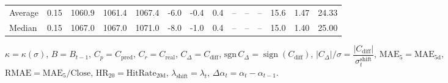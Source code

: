 \begin{threeparttable}
{\begin{tabular}{lrrrrrrrrrrrrr}
Average &     0.15 & 1060.9 & 1061.4 & 1067.4 &       -6.0 &                     -0.4 &                 0.4 &         -- &        -- &             -- &             15.6 &            1.47 &                  24.33 \\
 Median &     0.15 & 1067.0 & 1067.0 & 1071.0 &       -8.0 &                     -1.0 &                 0.4 &         -- &        -- &             -- &             15.0 &            1.40 &                  25.00 \\
\bottomrule
\end{tabular}
}
\begin{tablenotes}\footnotesize
\item $\kappa=\kappa(\sigma)$, $B=B_{t-1}$, $C_p=C_{\text{pred}}$, $C_r=C_{\text{real}}$, $C_\Delta=C_{\text{diff}}$, $\mathrm{sgn}\,C_\Delta=\operatorname{sign}(C_{\text{diff}})$, $|C_\Delta|/\sigma=\dfrac{|C_{\text{diff}}|}{\sigma_t^{\text{shift}}}$, $\mathrm{MAE}_5=\mathrm{MAE}_{5\text{d}}$, $\mathrm{RMAE}= \mathrm{MAE}_5 / \text{Close}$, $\mathrm{HR}_{20}=\mathrm{HitRate}_{20\text{d}}$, 
$\lambda_{\text{shift}}=\lambda_t$, 
$\Delta\alpha_t=\alpha_t-\alpha_{t-1}$.
\end{tablenotes}
\end{threeparttable}
\endgroup

